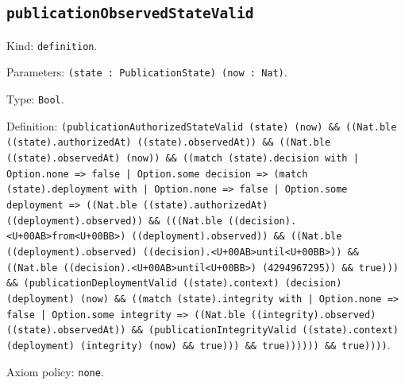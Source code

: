\documentclass[11pt]{article}
\begin{document}
\subsection*{\texttt{publicationObservedStateValid}}
\noindent Kind: \texttt{definition}.\par
\noindent Parameters: \texttt{(state : PublicationState) (now : Nat)}.\par
\noindent Type: \texttt{Bool}.\par
\noindent Definition: \texttt{(publicationAuthorizedStateValid (state) (now) \&\& ((Nat.ble ((state).authorizedAt) ((state).observedAt)) \&\& ((Nat.ble ((state).observedAt) (now)) \&\& ((match (state).decision with | Option.none => false | Option.some decision => (match (state).deployment with | Option.none => false | Option.some deployment => ((Nat.ble ((state).authorizedAt) ((deployment).observed)) \&\& (((Nat.ble ((decision).<U+00AB>from<U+00BB>) ((deployment).observed)) \&\& ((Nat.ble ((deployment).observed) ((decision).<U+00AB>until<U+00BB>)) \&\& ((Nat.ble ((decision).<U+00AB>until<U+00BB>) (4294967295)) \&\& true))) \&\& (publicationDeploymentValid ((state).context) (decision) (deployment) (now) \&\& ((match (state).integrity with | Option.none => false | Option.some integrity => ((Nat.ble ((integrity).observed) ((state).observedAt)) \&\& (publicationIntegrityValid ((state).context) (deployment) (integrity) (now) \&\& true))) \&\& true)))))) \&\& true))))}.\par
\noindent Axiom policy: \texttt{none}.\par
\end{document}
